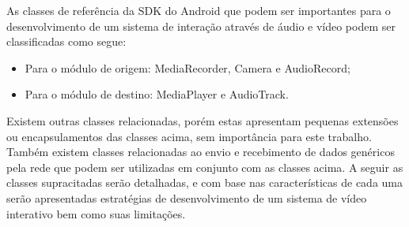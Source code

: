 \documentclass{acm_proc_article-sp}
\begin{document}
As classes de referência da SDK do Android que podem ser importantes para o desenvolvimento de um sistema de interação através de áudio e vídeo podem ser classificadas como segue:
\begin{itemize}
 \item Para o módulo de origem: MediaRecorder, Camera e AudioRecord;
 \item Para o módulo de destino: MediaPlayer e AudioTrack.
\end{itemize}

Existem outras classes relacionadas, porém estas apresentam pequenas extensões ou encapsulamentos das classes acima, sem importância para este trabalho. Também existem classes relacionadas ao envio e recebimento de dados genéricos pela rede que podem ser utilizadas em conjunto com as classes acima. A seguir as classes supracitadas serão detalhadas, e com base nas características de cada uma serão apresentadas estratégias de desenvolvimento de um sistema de vídeo interativo bem como suas limitações.

\end{document}
